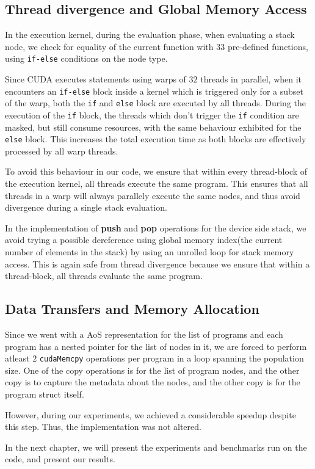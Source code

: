 \subsection{Thread divergence and Global Memory Access}
\label{prob:divergence}
In the execution kernel, during the evaluation phase, when evaluating a stack node, we check for equality of the current function with $33$ pre-defined functions, using \lstinline!if-else! conditions on the node type. 

Since CUDA executes statements using warps of $32$ threads in parallel, when it encounters an \lstinline!if-else! block inside a kernel which is triggered only for a subset of the warp, both the \lstinline!if! and \lstinline!else! block are executed by all threads. During the execution of the \lstinline!if! block, the threads which don't trigger the \lstinline!if! condition are masked, but still consume resources, with the same behaviour exhibited for the \lstinline!else! block. This increases the total execution time as both blocks are effectively processed by all warp threads. 

To avoid this behaviour in our code, we ensure that within every thread-block of the execution kernel, all threads execute the same program. This ensures that all threads in a warp will always parallely execute the same nodes, and thus avoid divergence during a single stack evaluation.

In the implementation of \textbf{push} and \textbf{pop} operations for the device side stack, we avoid trying a possible dereference using global memory index(the current number of elements in the stack) by using an unrolled loop for stack memory access. This is again safe from thread divergence because we ensure that within a thread-block, all threads evaluate the same program. 

\subsection{Data Transfers and Memory Allocation}
\label{prob:memcpy}
Since we went with a AoS representation for the list of programs and each program has a nested pointer for the list of nodes in it, we are forced to perform atleast $2$ \lstinline!cudaMemcpy! operations per program in a loop spanning the population size. One of the copy operations is for the list of program nodes, and the other copy is to capture the metadata about the nodes, and the other copy is for the program struct itself. 

However, during our experiments, we achieved a considerable speedup despite this step. Thus, the implementation was not altered.

In the next chapter, we will present the experiments and benchmarks run on the code, and present our results. 





